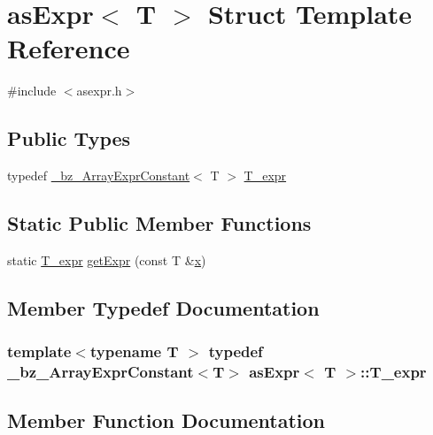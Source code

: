 \hypertarget{structasExpr}{}\section{as\+Expr$<$ T $>$ Struct Template Reference}
\label{structasExpr}


{\ttfamily \#include $<$asexpr.\+h$>$}

\subsection*{Public Types}
\begin{DoxyCompactItemize}
\item 
typedef \hyperlink{class__bz__ArrayExprConstant}{\+\_\+bz\+\_\+\+Array\+Expr\+Constant}$<$ T $>$ \hyperlink{structasExpr_a399ab1c72dd423ca279474cd56f15cf9}{T\+\_\+expr}
\end{DoxyCompactItemize}
\subsection*{Static Public Member Functions}
\begin{DoxyCompactItemize}
\item 
static \hyperlink{structasExpr_a399ab1c72dd423ca279474cd56f15cf9}{T\+\_\+expr} \hyperlink{structasExpr_a3456e8634afe56a1787fad83e9988345}{get\+Expr} (const T \&\hyperlink{vecnorm1_8cc_ac73eed9e41ec09d58f112f06c2d6cb63}{x})
\end{DoxyCompactItemize}


\subsection{Member Typedef Documentation}
\hypertarget{structasExpr_a399ab1c72dd423ca279474cd56f15cf9}{}
\subsubsection[{T\+\_\+expr}]{\setlength{\rightskip}{0pt plus 5cm}template$<$typename T $>$ typedef {\bf \+\_\+bz\+\_\+\+Array\+Expr\+Constant}$<$T$>$ {\bf as\+Expr}$<$ T $>$\+::{\bf T\+\_\+expr}}\label{structasExpr_a399ab1c72dd423ca279474cd56f15cf9}


\subsection{Member Function Documentation}
\hypertarget{structasExpr_a3456e8634afe56a1787fad83e9988345}{}
